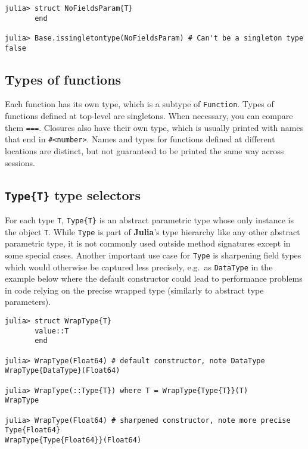 \documentclass[
]{article}
\begin{document}
\begin{verbatim}
julia> struct NoFieldsParam{T}
       end

julia> Base.issingletontype(NoFieldsParam) # Can't be a singleton type
false
\end{verbatim}

\hypertarget{types-of-functions}{%
\subsection{Types of functions}\label{types-of-functions}}

Each function has its own type, which is a subtype of \texttt{Function}.
Types of functions defined at top-level are singletons. When necessary,
you can compare them \texttt{===}. Closures also have their own type,
which is usually printed with names that end in
\texttt{\#\textless{}number\textgreater{}}. Names and types for
functions defined at different locations are distinct, but not
guaranteed to be printed the same way across sessions.

\hypertarget{typet-type-selectors}{%
\subsection{\texorpdfstring{\texttt{Type\{T\}} type
selectors}{Type\{T\} type selectors}}\label{typet-type-selectors}}

For each type \texttt{T}, \texttt{Type\{T\}} is an abstract parametric
type whose only instance is the object \texttt{T}. While \texttt{Type}
is part of \textbf{Julia}'s type hierarchy like any other abstract
parametric type, it is not commonly used outside method signatures
except in some special cases. Another important use case for
\texttt{Type} is sharpening field types which would otherwise be
captured less precisely, e.g.~as \texttt{DataType} in the example below
where the default constructor could lead to performance problems in code
relying on the precise wrapped type (similarly to abstract type
parameters).

\begin{verbatim}
julia> struct WrapType{T}
       value::T
       end

julia> WrapType(Float64) # default constructor, note DataType
WrapType{DataType}(Float64)

julia> WrapType(::Type{T}) where T = WrapType{Type{T}}(T)
WrapType

julia> WrapType(Float64) # sharpened constructor, note more precise Type{Float64}
WrapType{Type{Float64}}(Float64)
\end{verbatim}
\end{document}
